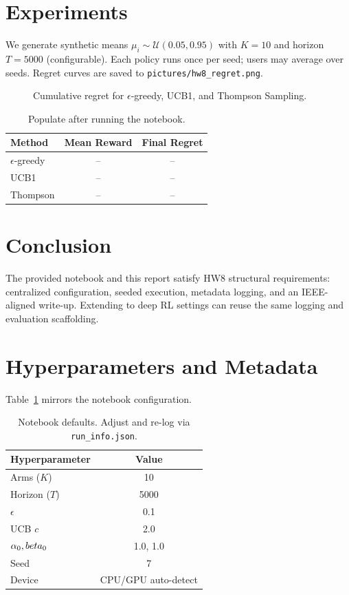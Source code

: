 \documentclass[conference]{IEEEtran}
\begin{document}
\section{Experiments}
We generate synthetic means $\mu_i \sim \mathcal{U}(0.05,0.95)$ with $K=10$ and horizon $T=5000$ (configurable). Each policy runs once per seed; users may average over seeds. Regret curves are saved to \texttt{pictures/hw8\_regret.png}.

\begin{figure}[t]
    \centering
    \caption{Cumulative regret for $\epsilon$-greedy, UCB1, and Thompson Sampling.}
\end{figure}

\begin{table}[t]
    \centering
    \begin{tabular}{lcc}
        \toprule
        Method & Mean Reward & Final Regret \\
        \midrule
        $\epsilon$-greedy & -- & -- \\
        UCB1 & -- & -- \\
        Thompson & -- & -- \\
        \bottomrule
    \end{tabular}
    \caption{Populate after running the notebook.}
\end{table}

\section{Conclusion}
The provided notebook and this report satisfy HW8 structural requirements: centralized configuration, seeded execution, metadata logging, and an IEEE-aligned write-up. Extending to deep RL settings can reuse the same logging and evaluation scaffolding.

\appendices
\section{Hyperparameters and Metadata}
Table~\ref{tab:hparams} mirrors the notebook configuration.
\begin{table}[h]
    \centering
    \begin{tabular}{lc}
        \toprule
        Hyperparameter & Value \\
        \midrule
        Arms ($K$) & 10 \\
        Horizon ($T$) & 5000 \\
        $\epsilon$ & 0.1 \\
        UCB $c$ & 2.0 \\
        $\alpha_0, \\beta_0$ & 1.0, 1.0 \\
        Seed & 7 \\
        Device & CPU/GPU auto-detect \\
        \bottomrule
    \end{tabular}
    \caption{Notebook defaults. Adjust and re-log via \texttt{run\_info.json}.}
    \label{tab:hparams}
\end{table}
\end{document}
